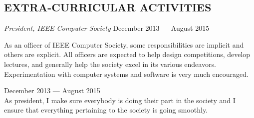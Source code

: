 \documentclass[margin]{res}
\begin{document}
\begin{resume}
  \section{EXTRA-CURRICULAR ACTIVITIES}
  {\sl President, IEEE Computer Society}
  \hfill December 2013 --- August 2015 \\
  \vspace{-1.0em}
  \begin{adjustwidth}{1.5em}{0pt}
    As an officer of IEEE Computer Society, some responsibilities are
    implicit and others are explicit. All officers are expected to
    help design competitions, develop lectures, and generally help the
    society excel in its various endeavors. Experimentation with
    computer systems and software is very much encouraged.
    \begin{description}[leftmargin=1.5em]
    \item [President] \hfill December 2013 --- August 2015 \\
      As president, I make sure everybody is doing their part in the
      society and I ensure that everything pertaining to the society is
      going smoothly.
    \end{description}
  \end{adjustwidth}

\end{resume}
\end{document}
